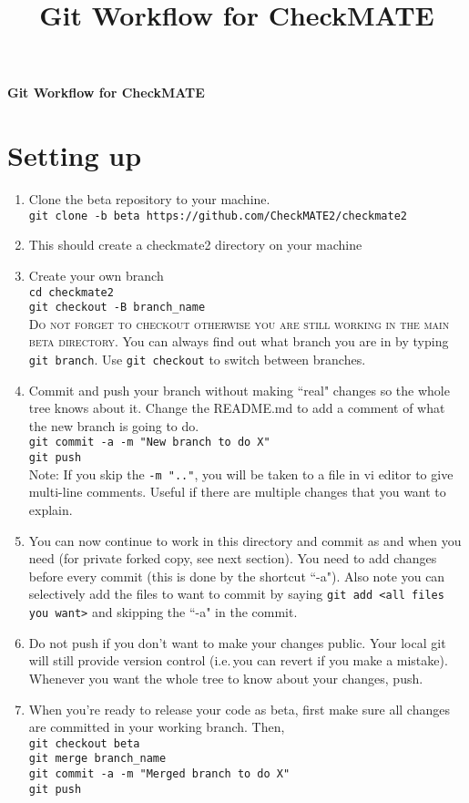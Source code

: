 \documentclass[12pt]{article}
\title{Git Workflow for CheckMATE}
\date{}
\begin{document}

\vskip -2in
\begin{center}
\LARGE{\bf Git Workflow for CheckMATE}\\
\end{center}

\section{Setting up}

\begin{enumerate}
\item Clone the beta repository to your machine.\\
\texttt{git clone -b beta https://github.com/CheckMATE2/checkmate2}
\item This should create a checkmate2 directory on your machine
\item Create your own branch \\
\texttt{cd checkmate2} \\
\texttt{git checkout -B branch\_name} \\ 
{\color{red} \textsc{Do not forget to checkout otherwise you are still working in the main beta directory.} }You can always find out what branch you are in by typing \texttt{git branch}.  Use \texttt{git checkout} to switch between branches.
\item Commit and push your branch without making ``real" changes so the whole tree knows about it. Change the README.md to add a comment of what the new branch is going to do. \\
\texttt{git commit -a -m "New branch to do X" }\\
\texttt{git push} \\
Note: If you skip the \texttt{-m ".."}, you will be taken to a file in vi editor to give multi-line comments.  Useful if there are multiple changes that you want to explain.
\item You can now continue to work in this directory and commit as and when you need (for private forked copy, see next section).  You need to add changes before every commit (this is done by the shortcut ``-a").  Also note you can selectively add the files to want to commit by saying \texttt{git add <all files you want>} and skipping the ``-a" in the commit. 
\item Do not push if you don't want to make your changes public.  Your local git will still provide version control (i.e.\,you can revert if you make a mistake). Whenever you want the whole tree to know about your changes, push.
\item When you're ready to release your code as beta, first make sure all changes are committed in your working branch.  Then,\\
\texttt{git checkout beta} \\
\texttt{git merge branch\_name} \\
\texttt{git commit -a -m "Merged branch to do X"} \\
\texttt{git push} \\
\end{enumerate}
\end{document}
